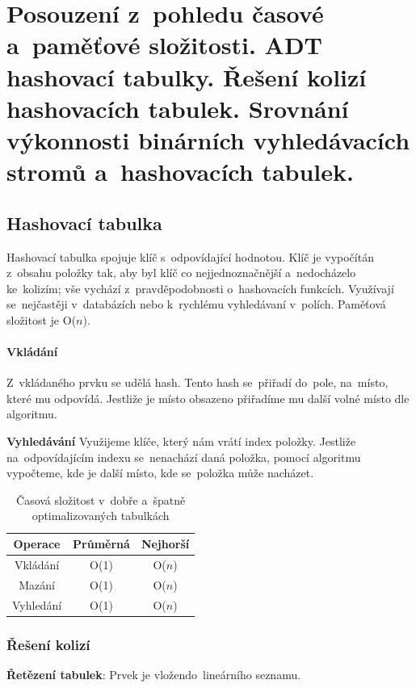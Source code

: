 \section{Posouzení z~pohledu časové a~paměťové složitosti. ADT hashovací tabulky. Řešení kolizí hashovacích tabulek. Srovnání výkonnosti binárních vyhledávacích stromů a~hashovacích tabulek.}

\subsection{Hashovací tabulka}

Hashovací tabulka spojuje klíč s~odpovídající hodnotou. Klíč je vypočítán z~obsahu položky tak, aby byl klíč co nejjednoznačnější a~nedocházelo ke~kolizím; vše vychází z~pravděpodobnosti o~hashovacích funkcích. Využívají se~nejčastěji v~databázích nebo k~rychlému vyhledávaní v~polích. Paměťová složitost je O($n$).

\paragraph{Vkládání} Z~vkládaného prvku se udělá hash. Tento hash se~přiřadí do~pole, na~místo, které mu odpovídá. Jestliže je místo obsazeno přiřadíme mu další volné místo dle algoritmu.

\textbf{Vyhledávání} Využijeme klíče, který nám vrátí index položky. Jestliže na~odpovídajícím indexu se~nenachází daná položka, pomocí algoritmu vypočteme, kde je další místo, kde se~položka může nacházet.

\begin{table}[ht]
	\centering
	\caption{Časová složitost v~dobře a~špatně optimalizovaných tabulkách}
	\begin{tabular}{|c|c|c|}
	\hline
		Operace   & Průměrná & Nejhorší \\\hline
		Vkládání  & O(1)     & O($n$)   \\\hline
		Mazání    & O(1)     & O($n$)   \\\hline
		Vyhledání & O(1)     & O($n$)   \\\hline
	\end{tabular}
\end{table}

\subsubsection{Řešení kolizí}

\textbf{Řetězení tabulek}: Prvek je vložendo~lineárního seznamu.

